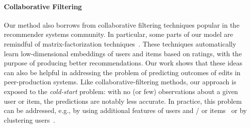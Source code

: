 \paragraph{Collaborative Filtering}
Our method also borrows from collaborative filtering techniques popular in the recommender systems community.
In particular, some parts of our model are remindful of matrix-factorization techniques~\citep{koren2009matrix}.
These techniques automatically learn low-dimensional embeddings of users and items based on ratings, with the purpose of producing better recommendations.
Our work shows that these ideas can also be helpful in addressing the problem of predicting outcomes of edits in peer-production systems.
Like collaborative-filtering methods, our approach is exposed to the \emph{cold-start} problem:
with no (or few) observations about a given user or item, the predictions are notably less accurate.
In practice, this problem can be addressed, e.g., by using additional features of users and / or items~\citep{schein2002methods, lam2008addressing} or by clustering users~\citep{levi2012finding}.
